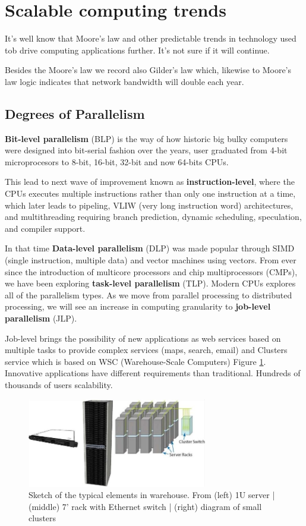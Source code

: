 \documentclass[12pt]{report}
\begin{document}
\section{Scalable computing trends}
It's well know that Moore's law and other predictable trends in technology used tob drive computing applications further. It's not sure if it will continue.

Besides the Moore's law we record also Gilder's law which, likewise to Moore's law logic indicates that network bandwidth will double each year.

\subsection*{Degrees of Parallelism}
\textbf{Bit-level parallelism} (BLP) is the way of how historic big bulky computers were designed into bit-serial fashion over the years, user graduated from 4-bit microprocesors to 8-bit, 16-bit, 32-bit and now 64-bits CPUs.

This lead to next wave of improvement known as \textbf{instruction-level}, where the CPUs executes multiple instructions rather than only one instruction at a time, which later leads to pipeling, VLIW (very long instruction word) architectures, and multithreading requiring branch prediction, dynamic scheduling, speculation, and compiler support.%

In that time \textbf{Data-level parallelism} (DLP) was made popular through SIMD (single instruction, multiple data) and vector machines using vectors. From ever since the introduction of multicore processors and chip multiprocessors (CMPs), we have been exploring \textbf{task-level parallelism} (TLP). Modern CPUs explores all of the parallelism types. As we move from parallel processing to distributed processing, we will see an increase in computing granularity to \textbf{job-level parallelism} (JLP).

Job-level brings the possibility of new applications as web services based on multiple tasks to provide complex services (maps, search, email) and Clusters service which is based on WSC (Warehouse-Scale Computers) Figure \ref{img2}. Innovative applications have different requirements than traditional. Hundreds of thousands of users scalability.

\begin{figure}[ht]
\centering
     \includegraphics[width=0.7\textwidth]{img3.jpg}
      \caption{Sketch of the typical elements in warehouse. From (left) 1U server | (middle) 7' rack with Ethernet switch | (right) diagram of small clusters}
       \label{img2}
\end{figure}    
\end{document}
